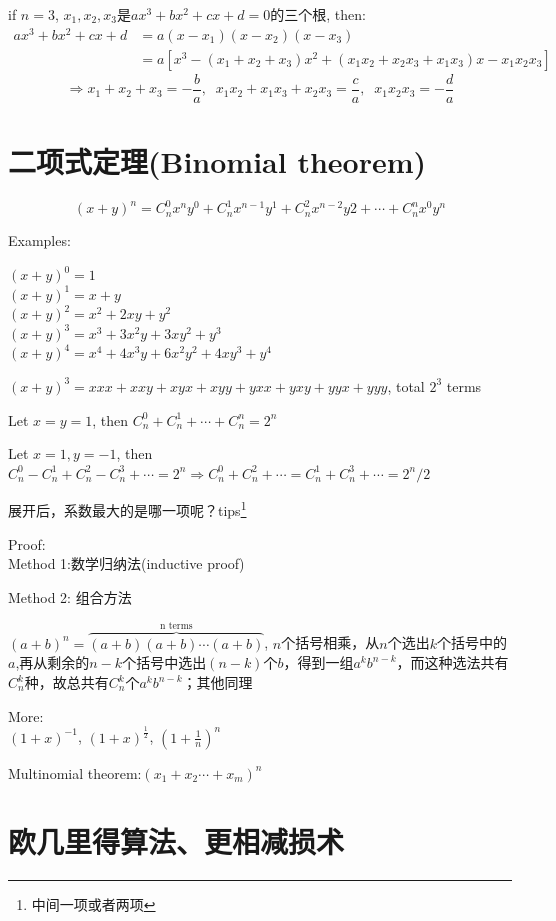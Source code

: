 \documentclass[../main.tex]{subfiles}
\begin{document}
if $n=3$, $x_1, x_2, x_3$是$ax^3+bx^2+cx+d=0$的三个根, then:
\begin{align*}
  ax^3+bx^2+cx+d &= a(x-x_1)(x-x_2)(x-x_3)\\
                 &=a[x^3-(x_1+x_2+x_3)x^2+(x_1x_2+x_2x_3+x_1x_3)x- x_1x_2x_3]
\end{align*}
\[ \Rightarrow x_1+x_2+x_3= -\frac{b}{a},\;\; x_1x_2+x_1x_3+x_2x_3=\frac{c}{a},\;\; x_1x_2x_3=-\frac{d}{a} \]

\section{二项式定理(Binomial theorem)}
$$ (x+y)^{n}=C_{n}^{0}x^{n}y^{0}+C_{n}^1x^{n-1}y^1+C_{n}^2x^{n-2}y2+\cdots +C_{n}^{n}x^{0}y^{n} $$

Examples:

$(x+y)^{0}=1$\\
$(x+y)^1=x+y$\\
$(x+y)^2=x^2+2xy+y^2$\\
$(x+y)^3=x^3+3x^2y+3xy^2+y^3$\\
$(x+y)^4=x^4+4x^3y+6x^2y^2+4xy^3+y^4$

$(x+y)^3=xxx+xxy+xyx+xyy+yxx+yxy+yyx+yyy$, total $2^3$ terms

Let $x=y=1$, then $C_{n}^{0}+C_{n}^1+\cdots +C_{n}^{n}=2^n$

Let $x=1, y=-1$, then $C_n^0-C_n^1+C_n^2-C_n^3+\cdots=2^n \Rightarrow C_n^0+C_n^2+\cdots = C_n^1+C_n^3+\cdots = 2^n/2$

展开后，系数最大的是哪一项呢？tips\footnote{中间一项或者两项}

Proof:\\
Method 1:数学归纳法(inductive proof)

Method 2: 组合方法

$(a+b)^{n}=\overbrace{(a+b)(a+b)\cdots (a+b)}^{\text{n terms}}$, $n$个括号相乘，从$n$个选出$k$个括号中的$a$,再从剩余的$n-k$个括号中选出$(n-k)$个$b$，得到一组$a^{k}b^{n-k}$，而这种选法共有$C_{n}^{k}$种，故总共有$C_{n}^{k}$个$a^{k}b^{n-k}$；其他同理

More:\\
$(1+x)^{-1}$, $(1+x)^{\frac{1}{2}}$, $(1+\frac{1}{n})^{n}$

Multinomial theorem:$(x_1+x_2\cdots +x_{m})^{n}$

\section{欧几里得算法、更相减损术}
\end{document}
